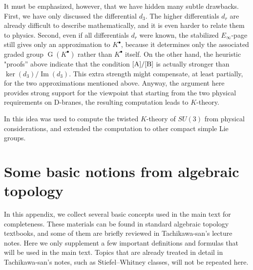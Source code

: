 \documentclass[a4paper,11pt]{article}
\theoremstyle{definition}
\theoremstyle{remark}
\begin{document}
It must be emphasized, however, that we have hidden many subtle drawbacks.
First, we have only discussed the differential $d_3$. The higher differentials $d_r$ are already difficult to describe mathematically, and it is even harder to relate them to physics. Second, even if all differentials $d_r$ were known, the stabilized $E_\infty$-page still gives only an approximation to $K^\bullet$, because it determines only the associated graded group $\operatorname{G}(K^\bullet)$ rather than $K^\bullet$ itself. On the other hand, the heuristic "proofs'' above indicate that the condition $\eqref{A}/\eqref{B}$ is actually stronger than $\ker(d_3)/\operatorname{Im}(d_3)$. This extra strength might compensate, at least partially, for the two approximations mentioned above.
Anyway, the argument here provides strong support for the viewpoint that starting from the two physical requirements on D-branes, the resulting computation leads to $K$-theory.

In \cite{Maldacena:2001xj,Moore:2003vf} this idea was used to compute the twisted $K$-theory of $SU(3)$ from physical considerations, and \cite{Braun:2003rd, Rosenberg:2017iej} extended the computation to other compact simple Lie groups.

\appendix
\section{Some basic notions from algebraic topology}
In this appendix, we collect several basic concepts used in the main text for completeness. These materials can be found in standard algebraic topology textbooks, and some of them are briefly reviewed in Tachikawa-san’s lecture notes. Here we only supplement a few important definitions and formulas that will be used in the main text. Topics that are already treated in detail in Tachikawa-san’s notes, such as Stiefel--Whitney classes, will not be repeated here.
\end{document}
